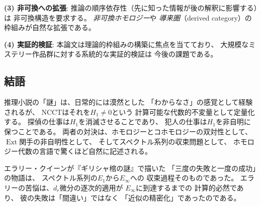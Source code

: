 \documentclass[12pt,twocolumn]{ltjsarticle}
\newcommand{\Ext}{\operatorname{Ext}}
\begin{document}
\textbf{(3) 非可換への拡張}:
推論の順序依存性（先に知った情報が後の解釈に影響する）は
非可換構造を要求する。
\emph{非可換ホモロジー}や
\emph{導来圏}（derived category）の枠組みが自然な拡張である。

\textbf{(4) 実証的検証}:
本論文は理論的枠組みの構築に焦点を当てており、
大規模なミステリー作品群に対する系統的な実証的検証は
今後の課題である。

\subsection{結語}

推理小説の「謎」は、日常的には漠然とした
「わからなさ」の感覚として経験されるが、
NCCTはそれを$H_1 \neq 0$という
計算可能な代数的不変量として定量化する。
探偵の仕事は$H_1$を消滅させることであり、
犯人の仕事は$H_1$を非自明に保つことである。
両者の対決は、ホモロジーとコホモロジーの双対性として、
$\Ext$関手の非自明性として、
そしてスペクトル系列の収束問題として、
ホモロジー代数の言語で驚くほど自然に記述される。

エラリー・クイーンが『ギリシャ棺の謎』で描いた
「三度の失敗と一度の成功」の物語は、
スペクトル系列の$E_1$から$E_\infty$への
収束過程そのものであった。
エラリーの苦悩は、$d_r$微分の逐次的適用が
$E_\infty$に到達するまでの
計算的必然であり、
彼の失敗は「間違い」ではなく
「近似の精密化」であったのである。
\end{document}
